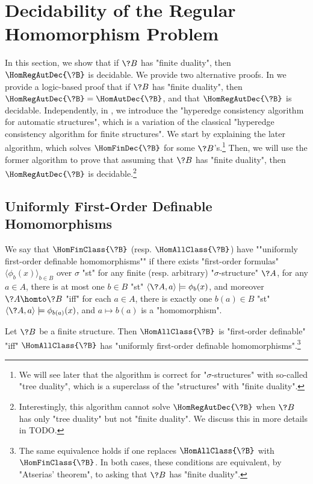 \section{\AP\label{sec:dichotomy-decidability}%
	Decidability of the Regular Homomorphism Problem}

In this section, we show that if $\?B$ has "finite duality", then $\HomRegAutDec{\?B}$ is decidable.
We provide two alternative proofs. In  we provide
a logic-based proof that if $\?B$ has "finite duality", then $\HomRegAutDec{\?B} = \HomAutDec{\?B}$,
and that $\HomRegAutDec{\?B}$ is decidable.
Independently, in ,
we introduce the "hyperedge consistency algorithm for automatic structures",
which is a variation of the classical "hyperedge consistency algorithm for finite structures".
We start by explaining the later algorithm,
which solves $\HomFinDec{\?B}$ for some $\?B$'s.\footnote{We will
see later that the algorithm is correct for "$\sigma$-structures" with so-called "tree duality",
which is a superclass of the "structures" with "finite duality".}
Then, we will use the former algorithm to prove that assuming that $\?B$ has "finite duality",
then $\HomRegAutDec{\?B}$ is decidable.\footnote{Interestingly, this algorithm cannot solve
$\HomRegAutDec{\?B}$ when $\?B$ has only "tree duality" but not "finite duality". 
We discuss this in more details in TODO.}

\subsection{\AP\label{sec:uniformly-first-order-definable-hom}%
	Uniformly First-Order Definable Homomorphisms}

We say that $\HomFinClass{\?B}$ (resp. $\HomAllClass{\?B}$)
have \AP""uniformly first-order definable homomorphisms"" if there exists "first-order formulas"
$\langle \phi_b(x) \rangle_{b\in B}$ over $\sigma$ "st" for any finite
(resp. arbitrary) "$\sigma$-structure" $\?A$, for any $a\in A$,
there is at most one $b \in B$ "st" $\langle \?A, a \rangle \models \phi_b(x)$, and moreover $\?A \homto \?B$
"iff" for each $a\in A$, there is exactly one $b(a) \in B$ "st" $\langle \?A, a \rangle \models \phi_{b(a)}(x)$, and $a \mapsto b(a)$ is a "homomorphism".

\begin{lemma}
	\AP\label{lemma:finite-duality-uniformly-definable-homomorphisms}
	Let $\?B$ be a finite structure. Then $\HomAllClass{\?B}$ is "first-order definable" "iff"
	$\HomAllClass{\?B}$ has "uniformly first-order definable homomorphisms".\footnote{The same 
	equivalence holds if one replaces $\HomAllClass{\?B}$ with $\HomFinClass{\?B}$.
	In both cases, these conditions are equivalent, by "Atserias' theorem", to asking that $\?B$
	has "finite duality".}
\end{lemma}

